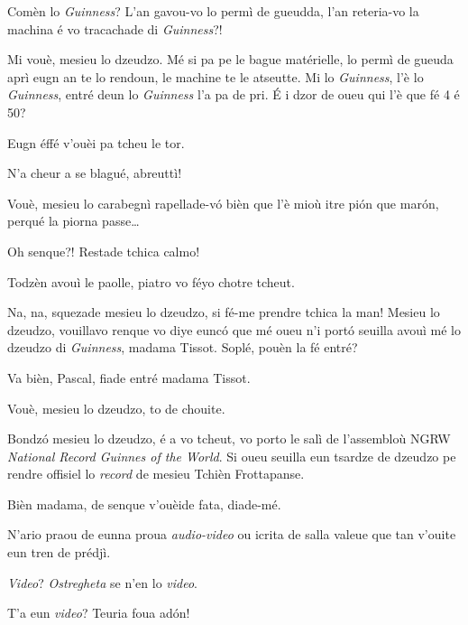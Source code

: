\begin{drama}
\DzeudzoSenliquerspeaks Comèn lo \textit{Guinness}?  L'an gavou-vo lo permì de gueud\-da, l'an reteria-vo la machina é vo tracachade di \textit{Guinness}?!

\Cienspeaks Mi vouè, mesieu lo dzeudzo. Mé si pa pe le bague matérielle, lo permì de gueuda aprì eugn an te lo rendoun, le machine te le atseutte. Mi lo \textit{Guinness}, l'è lo \textit{Guinness}, entré deun lo \textit{Guinness} l'a pa de pri. É i dzor de oueu qui l'è que fé 4 é 50?

\DzeudzoSenliquerspeaks Eugn éffé v'ouèi pa tcheu le tor.

\Ticspeaks N'a cheur a se blagué, abreuttì!

\Cienspeaks Vouè, mesieu lo carabegnì rapellade-v\'o bièn que l'è mioù itre pi\'on que marón, perqué la piorna passe\ldots

\Ticspeaks {} Oh senque?! Restade tchica calmo!

\DzeudzoSenliquerspeaks {} Todzèn avouì le paolle, piatro vo féyo chotre tcheut.

\Cienspeaks Na, na, squezade mesieu lo dzeudzo, si fé-me pren\-dre tchica la man! Mesieu lo dzeudzo, vouillavo renque vo diye eunc\'o que mé oueu n’i portó seuilla avouì mé lo dzeudzo di \textit{Guinness}, madama Tissot. Soplé, pouèn la fé entré?

\DzeudzoSenliquerspeaks Va bièn, Pascal, fiade entré madama Tissot.

\Pascalspeaks Vouè, mesieu lo dzeudzo, to de chouite.


\Tissotspeaks Bondzó mesieu lo dzeudzo, é a vo tcheut, vo porto le salì de l'assembloù NGRW \textit{National Record Guinnes of the World}. Si oueu seuilla eun tsardze de dzeudzo pe rendre offisiel lo \textit{record} de mesieu Tchièn Frottapanse.

\DzeudzoSenliquerspeaks {} Bièn madama, de senque v'ou\-èi\-de fata, diade-mé.

\Tissotspeaks N’ario praou de eunna proua \textit{audio-video} ou icrita de salla valeue que tan v'ouite eun tren de prédjì.

\Tacspeaks \textit{Video}? \textit{Ostregheta} se n’en lo \textit{video}.

\Cienspeaks T'a eun \textit{video}? Teuria foua adón!


\end{drama}
